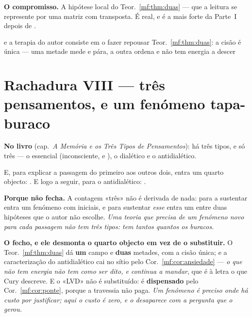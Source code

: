 \documentclass[../livro.tex]{subfiles}
\begin{document}
\medskip\noindent\textbf{O compromisso.} A hipótese local do
Teor.~\ref{mf:thm:duas} --- que a leitura se represente por uma matriz com
transposta. É real, e é a mais forte da Parte~I depois de .

      {e a terapia do autor consiste em o fazer repousar}
      {Teor.~\ref{mf:thm:duas}: a cisão é única --- uma metade mede e pára, a
       outra ordena e não tem energia a descer}

\section{Rachadura VIII --- três pensamentos, e um fenómeno tapa-buraco}\label{mf:r8}

\noindent\textbf{No livro} (cap.~\emph{A Memória e os Três Tipos de
Pensamentos}): há três tipos, e só três --- o essencial (inconsciente, e ), o dialético e o antidialético.

\noindent E, para explicar a passagem do primeiro aos outros dois, entra um
quarto objecto: . E
logo a seguir, para o antidialético: .

\medskip\noindent\textbf{Porque não fecha.} A contagem «três» não é derivada de
nada: para a sustentar entra um fenómeno com iniciais, e para sustentar
\emph{esse} entra um  entre duas hipóteses que o autor não
escolhe. \emph{Uma teoria que precisa de um fenómeno novo para cada passagem não
tem três tipos: tem tantos quantos os buracos.}

\medskip\noindent\textbf{O fecho, e ele desmonta o quarto objecto em vez de o
substituir.} O Teor.~\ref{mf:thm:duas} dá \textbf{um} campo e \textbf{duas}
metades, com a cisão única; e a caracterização do antidialético cai no sítio pelo
Cor.~\ref{mf:cor:ansiedade} --- \emph{o que não tem energia não tem como ser
dito, e continua a mandar}, que é à letra o que Cury descreve. E o «LVD» não é
substituído: é \textbf{dispensado} pelo Cor.~\ref{mf:cor:ponte}, porque a
travessia não paga. \emph{Um fenómeno é preciso onde há custo por justificar;
aqui o custo é zero, e o  desaparece com a pergunta que o
gerou.}
\end{document}
